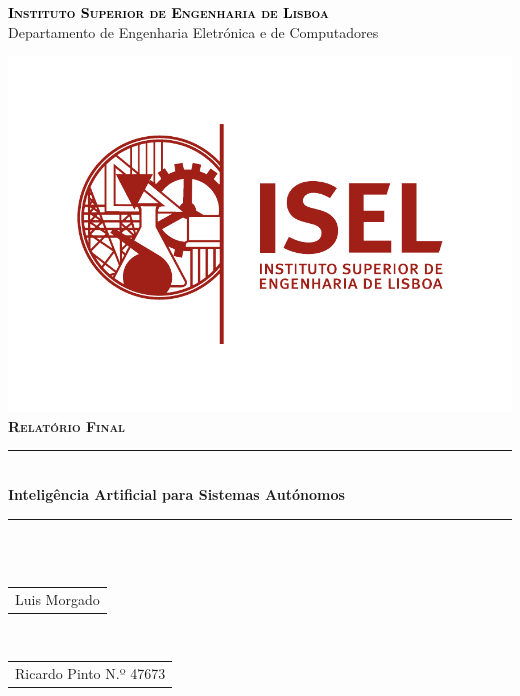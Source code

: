 \begin{titlepage}
\begin{center}

\textsc{\Large \textcolor{black}{\textbf{Instituto Superior de Engenharia de Lisboa}}}\\[0.4cm]	

{\huge \Large{Departamento de Engenharia Eletrónica e de Computadores} \\[1cm] }

\includegraphics{logoISEL}\\[1cm]

\textsc{\Large \textbf{Relatório Final}}\\[0.4cm]	


\rule{\linewidth}{0.7mm} \\[0.4cm]
{ \Large \bfseries\color{black!70!black} Inteligência Artificial para Sistemas Autónomos \\[0.4cm] }
\rule{\linewidth}{0.7mm} \\[1cm]


\\[0.6cm]

\begin{tabular}{l}
\large  Luis Morgado \\[1cm]
\end{tabular}

\\[0.6cm]
\color{black}
\centering
\begin{tabular}{l}

\large Ricardo Pinto N.º 47673 \\[0.4cm]
\end{tabular}

\vfill

\large {}\\[0.2cm]

\end{center}
\end{titlepage}